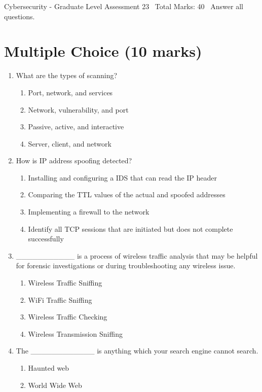 \documentclass[12pt]{article}
\begin{document}
\begin{center}
Cybersecurity - Graduate Level Assessment 23 \
Total Marks: 40 \
Answer all questions.
\end{center}

\section*{Multiple Choice (10 marks)}
\begin{enumerate}[label=\arabic*.]
\item What are the types of scanning?
\begin{enumerate}[label=(\alph*)]
    \item Port, network, and services
    \item Network, vulnerability, and port
    \item Passive, active, and interactive
    \item Server, client, and network
\end{enumerate}
\item How is IP address spoofing detected?
\begin{enumerate}[label=(\alph*)]
    \item Installing and configuring a IDS that can read the IP header
    \item Comparing the TTL values of the actual and spoofed addresses
    \item Implementing a firewall to the network
    \item Identify all TCP sessions that are initiated but does not complete successfully
\end{enumerate}
\item \_\_\_\_\_\_\_\_\_\_\_ is a process of wireless traffic analysis that may be helpful for forensic investigations or during troubleshooting any wireless issue.
\begin{enumerate}[label=(\alph*)]
    \item Wireless Traffic Sniffing
    \item WiFi Traffic Sniffing
    \item Wireless Traffic Checking
    \item Wireless Transmission Sniffing
\end{enumerate}
\item The \_\_\_\_\_\_\_\_\_\_\_\_ is anything which your search engine cannot search.
\begin{enumerate}[label=(\alph*)]
    \item Haunted web
    \item World Wide Web

\end{enumerate}
\end{enumerate}
\end{document}
